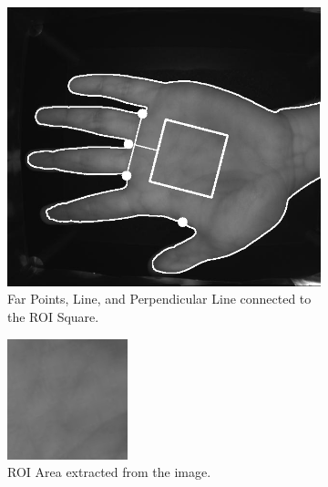 \begin{enumerate}
    \begin{figure}[!ht]
        \centering
        \begin{subfigure}[t]{0.48\columnwidth}
            \includegraphics[width=\textwidth]{./images/preprocessing/far_points_line_perpendicular_square_image.png}
            \caption{Far Points, Line, and Perpendicular Line connected to the ROI Square.}
            \label{fig:far_points_line_perpendicular_square_image}
        \end{subfigure}
        \hfill
        \begin{subfigure}[t]{0.48\columnwidth}
            \includegraphics[width=\textwidth]{./images/preprocessing/rectified_image.png}
            \caption{ROI Area extracted from the image.}
            \label{fig:rectified_image}
        \end{subfigure}
        \caption{}
    \end{figure}


\end{enumerate}
